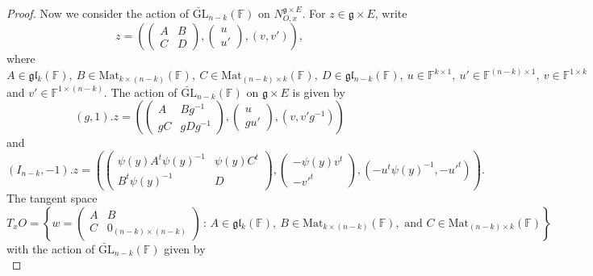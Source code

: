 \documentclass[12pt]{amsart}
\theoremstyle{definition}
\theoremstyle{remark}\newtheorem{rmk}[lm]{Remark}
\newcommand{\GL}{{\mathrm{GL}}}
\newcommand{\Mat}{{\mathrm{Mat}}}
\newcommand{\g}{\mathfrak g}
\newcommand{\gC}{{\mathfrak g}_{\C}}
\renewcommand{\u}{\mathfrak u}
\newcommand{\gl}{\mathfrak g \mathfrak l}
\newcommand{\C}{\mathbb{F}}
\newcommand{\B}{\mathbf{B}}
\renewcommand{\mid}{\,:\,}
\begin{document}
\begin{proof}
    	Now we consider the action of $\breve{\GL}_{n-k}(\C)$ on $N_{O,x}^{\g\times E}$. For $z\in\g\times E$, write
    	\begin{equation*}
    		z=\left(\left(\begin{matrix}
    			A&B\\C&D
    		\end{matrix}\right),\left(\begin{matrix}
    		    u\\u'
    		\end{matrix}\right),(v,v')\right),
    	\end{equation*}
    	where $A\in\gl_k(\C),\ B\in\Mat_{k\times(n-k)}(\C),\ C\in\Mat_{(n-k)\times k}(\C),\ D\in\gl_{n-k}(\C),\ u\in\C^{k\times 1},\ u'\in\C^{(n-k)\times 1},\ v\in\C^{1\times k}$ and $v'\in\C^{1\times (n-k)}$. The action of $\breve{\GL}_{n-k}(\C)$ on $\g\times E$ is given by
    	\begin{equation*}
    		(g,1).z=\left(\left(\begin{matrix}
    			A&Bg^{-1}\\gC&gDg^{-1}
    		\end{matrix}\right),\left(\begin{matrix}
    			u\\gu'
    		\end{matrix}\right),(v,v'g^{-1})\right)
    	\end{equation*}
    	and
    	\begin{equation*}
    		(I_{n-k},-1).z=\left(\left(\begin{matrix}
    			\psi(y)A^t\psi(y)^{-1}&\psi(y)C^t\\B^t\psi(y)^{-1}&D
    		\end{matrix}\right),\left(\begin{matrix}
    			-\psi(y)v^t\\-v'^t
    		\end{matrix}\right),(-u^t\psi(y)^{-1},-u'^t)\right).
    	\end{equation*}
    	The tangent space
    	\begin{equation*}
    		T_xO=\left\{w=\left(\begin{matrix}
    			A&B\\C&0_{(n-k)\times(n-k)}
    		\end{matrix}\right)\mid A\in\gl_k(\C),\ B\in\Mat_{k\times(n-k)}(\C),\text{ and }C\in\Mat_{(n-k)\times k}(\C)\right\}
    	\end{equation*}
    	with the action of $\breve{\GL}_{n-k}(\C)$ given by
    	\begin{equation*}

\end{equation*}
\end{proof}
\end{document}
